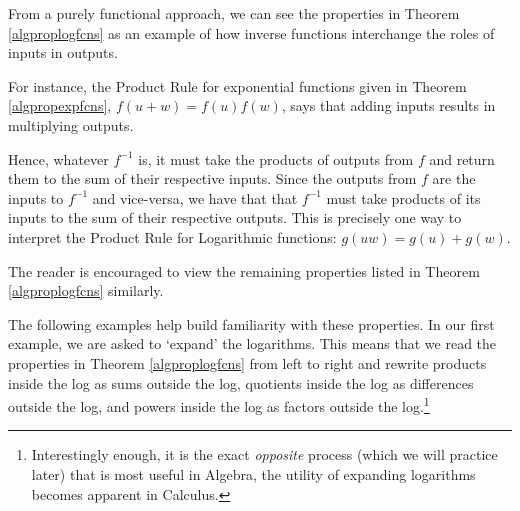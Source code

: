 \documentclass{ximera}
\begin{document}
From a purely functional approach, we can see the properties in Theorem \ref{algproplogfcns} as an example of how inverse functions interchange the roles of inputs in outputs.  



For instance, the Product Rule for exponential functions given in Theorem  \ref{algpropexpfcns}, $f(u+w) = f(u)f(w)$, says that adding inputs results in multiplying outputs.   



Hence, whatever $f^{-1}$ is, it must take the products of outputs from $f$ and return them to the sum of their respective inputs.  Since the outputs from $f$ are the inputs to $f^{-1}$ and vice-versa, we have that that $f^{-1}$ must take products of its inputs to the sum of their respective outputs. This is precisely one way to interpret the Product Rule for Logarithmic functions:  $g(uw) = g(u) + g(w)$.  



The reader is encouraged to view the remaining properties listed in Theorem \ref{algproplogfcns} similarly.  



The following examples help build familiarity with these properties.  In our first example, we are asked to `expand' the logarithms.  This means that we read the properties in Theorem \ref{algproplogfcns} from left to right and rewrite products inside the log as sums outside the log, quotients inside the log as  differences outside the log, and powers inside the log as factors outside the log.\footnote{Interestingly enough, it is the exact \textit{opposite} process (which we will practice later) that is most useful in Algebra, the utility of expanding logarithms becomes apparent in Calculus.}
\end{document}
